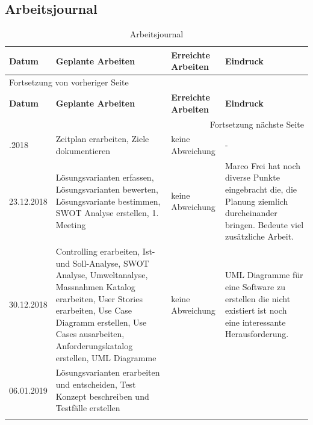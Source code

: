 \newpage
\begin{landscape}
\section{Arbeitsjournal}
\label{sec:org907f4fb}

\begin{longtable}{|p{2cm}|p{5cm}|p{5cm}|p{7cm}|}
\hline
\textbf{Datum}\cellcolor[HTML]{C0C0C0} & \textbf{Geplante Arbeiten}\cellcolor[HTML]{C0C0C0} & \textbf{Erreichte Arbeiten}\cellcolor[HTML]{C0C0C0} & \textbf{Eindruck}\cellcolor[HTML]{C0C0C0}\\
\hline
\endfirsthead
\multicolumn{4}{l}{Fortsetzung von vorheriger Seite} \\
\hline

\textbf{Datum}\cellcolor[HTML]{C0C0C0} & \textbf{Geplante Arbeiten}\cellcolor[HTML]{C0C0C0} & \textbf{Erreichte Arbeiten}\cellcolor[HTML]{C0C0C0} & \textbf{Eindruck}\cellcolor[HTML]{C0C0C0} \\

\hline
\endhead
\hline\multicolumn{4}{r}{Fortsetzung nächste Seite} \\
\endfoot
\endlastfoot
\hline
16.12.2018 & Zeitplan erarbeiten, Ziele dokumentieren & keine Abweichung & -\\
\hline
23.12.2018 & Lösungsvarianten erfassen, Lösungsvarianten bewerten, Lösungsvariante bestimmen, SWOT Analyse erstellen, 1. Meeting & keine Abweichung & Marco Frei hat noch diverse Punkte eingebracht die, die Planung ziemlich durcheinander bringen. Bedeute viel zusätzliche Arbeit.\\
\hline
30.12.2018 & Controlling erarbeiten, Ist- und Soll-Analyse, SWOT Analyse, Umweltanalyse, Massnahmen Katalog erarbeiten, User Stories erarbeiten, Use Case Diagramm erstellen, Use Cases ausarbeiten, Anforderungskatalog erstellen, UML Diagramme & keine Abweichung & UML Diagramme für eine Software zu erstellen die nicht existiert ist noch eine interessante Herausforderung.\\
\hline
06.01.2019 & Lösungsvarianten erarbeiten und entscheiden, Test Konzept beschreiben und Testfälle erstellen &  & \\
\hline
\caption{\label{tab:orge2b5828}
Arbeitsjournal}
\\
\end{longtable}
\end{landscape}
